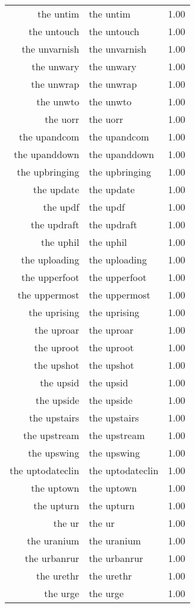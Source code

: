 \begin{table}[ht]
\begin{tabular}{rlr}
  the untim & the untim & 1.00 \\ 
  the untouch & the untouch & 1.00 \\ 
  the unvarnish & the unvarnish & 1.00 \\ 
  the unwary & the unwary & 1.00 \\ 
  the unwrap & the unwrap & 1.00 \\ 
  the unwto & the unwto & 1.00 \\ 
  the uorr & the uorr & 1.00 \\ 
  the upandcom & the upandcom & 1.00 \\ 
  the upanddown & the upanddown & 1.00 \\ 
  the upbringing & the upbringing & 1.00 \\ 
  the update & the update & 1.00 \\ 
  the updf & the updf & 1.00 \\ 
  the updraft & the updraft & 1.00 \\ 
  the uphil & the uphil & 1.00 \\ 
  the uploading & the uploading & 1.00 \\ 
  the upperfoot & the upperfoot & 1.00 \\ 
  the uppermost & the uppermost & 1.00 \\ 
  the uprising & the uprising & 1.00 \\ 
  the uproar & the uproar & 1.00 \\ 
  the uproot & the uproot & 1.00 \\ 
  the upshot & the upshot & 1.00 \\ 
  the upsid & the upsid & 1.00 \\ 
  the upside & the upside & 1.00 \\ 
  the upstairs & the upstairs & 1.00 \\ 
  the upstream & the upstream & 1.00 \\ 
  the upswing & the upswing & 1.00 \\ 
  the uptodateclin & the uptodateclin & 1.00 \\ 
  the uptown & the uptown & 1.00 \\ 
  the upturn & the upturn & 1.00 \\ 
  the ur & the ur & 1.00 \\ 
  the uranium & the uranium & 1.00 \\ 
  the urbanrur & the urbanrur & 1.00 \\ 
  the urethr & the urethr & 1.00 \\ 
  the urge & the urge & 1.00 \\ 

\end{tabular}
\end{table}
